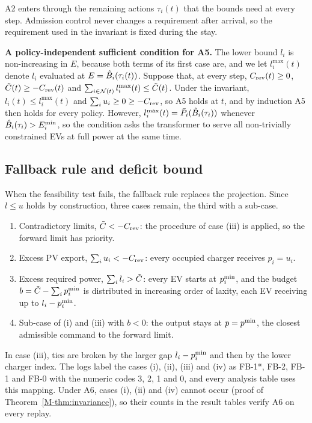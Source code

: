 A2 enters through the remaining actions $\tau_i(t)$ that the bounds need at every step.
Admission control never changes a requirement after arrival, so the requirement used in the invariant is fixed during the stay.

\textbf{A policy-independent sufficient condition for A5.}
The lower bound $l_i$ is non-increasing in $E$, because both terms of its first case are, and we let $l_i^{\max}(t)$ denote $l_i$ evaluated at $E=\hat B_i(\tau_i(t))$.
Suppose that, at every step, $C_{\mathrm{rev}}(t)\ge0$, $\tilde C(t)\ge-C_{\mathrm{rev}}(t)$ and $\sum_{i\in\mathcal N(t)}l_i^{\max}(t)\le\tilde C(t)$.
Under the invariant, $l_i(t)\le l_i^{\max}(t)$ and $\sum_iu_i\ge0\ge-C_{\mathrm{rev}}$, so A5 holds at $t$, and by induction A5 then holds for every policy.
However, $l_i^{\max}(t)=\bar P_i(\hat B_i(\tau_i))$ whenever $\hat B_i(\tau_i)>E_i^{\min}$, so the condition asks the transformer to serve all non-trivially constrained EVs at full power at the same time.

\subsection{Fallback rule and deficit bound}\label{app:fallback}

When the feasibility test fails, the fallback rule replaces the projection.
Since $l\le u$ holds by construction, three cases remain, the third with a sub-case.
\begin{enumerate}
\item[(i)] Contradictory limits, $\tilde C<-C_{\mathrm{rev}}$: the procedure of case (iii) is applied, so the forward limit has priority.
\item[(ii)] Excess PV export, $\sum_iu_i<-C_{\mathrm{rev}}$: every occupied charger receives $p_i=u_i$.
\item[(iii)] Excess required power, $\sum_il_i>\tilde C$: every EV starts at $p^{\min}_i$, and the budget $b=\tilde C-\sum_ip^{\min}_i$ is distributed in increasing order of laxity, each EV receiving up to $l_i-p^{\min}_i$.
\item[(iv)] Sub-case of (i) and (iii) with $b<0$: the output stays at $p=p^{\min}$, the closest admissible command to the forward limit.
\end{enumerate}
In case (iii), ties are broken by the larger gap $l_i-p^{\min}_i$ and then by the lower charger index.
The logs label the cases (i), (ii), (iii) and (iv) as FB-1*, FB-2, FB-1 and FB-0 with the numeric codes 3, 2, 1 and 0, and every analysis table uses this mapping.
Under A6, cases (i), (ii) and (iv) cannot occur (proof of Theorem~\ref{M-thm:invariance}), so their counts in the result tables verify A6 on every replay.


